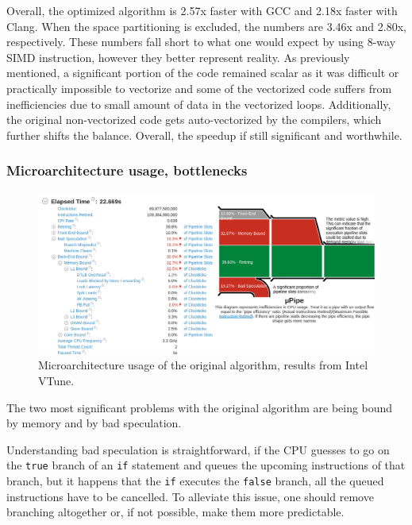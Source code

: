\documentclass[12pt]{article}
\newcommand{\code}[1]{\texttt{#1}}
\begin{document}
Overall, the optimized algorithm is 2.57x faster with GCC and 2.18x faster with Clang. When the space partitioning is excluded, the numbers are 3.46x and 2.80x, respectively. These numbers fall short to what one would expect by using 8-way SIMD instruction, however they better represent reality. As previously mentioned, a significant portion of the code remained scalar as it was difficult or practically impossible to vectorize and some of the vectorized code suffers from inefficiencies due to small amount of data in the vectorized loops. Additionally, the original non-vectorized code gets auto-vectorized by the compilers, which further shifts the balance. Overall, the speedup if still significant and worthwhile.

\subsubsection{Microarchitecture usage, bottlenecks}

\begin{figure}[H]
	\begin{center}
		\includegraphics[width=\textwidth]{velout_uarch_overall_orig}
	\end{center}
	\caption{Microarchitecture usage of the original algorithm, results from Intel VTune.}
	\label{fig_velout_uarch_overall_orig}
\end{figure}

The two most significant problems with the original algorithm are being bound by memory and by bad speculation.

Understanding bad speculation is straightforward, if the CPU guesses to go on the \code{true} branch of an \code{if} statement and queues the upcoming instructions of that branch, but it happens that the \code{if} executes the \code{false} branch, all the queued instructions have to be cancelled.\cite{intel_vtune_docs} To alleviate this issue, one should remove branching altogether or, if not possible, make them more predictable.
\end{document}
